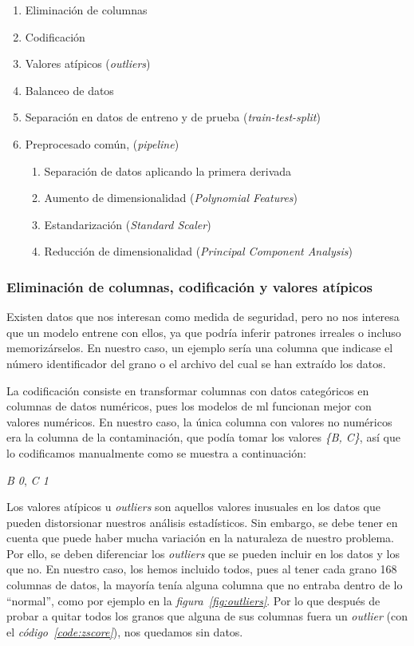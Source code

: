 \begin{enumerate}
    \item Eliminación de columnas
    \item Codificación
    \item Valores atípicos (\textit{outliers})
    \item Balanceo de datos
    \item Separación en datos de entreno y de prueba (\textit{train-test-split})
    \item Preprocesado común, (\textit{pipeline})
    \begin{enumerate}
        \item Separación de datos aplicando la primera derivada 
        \item Aumento de dimensionalidad (\textit{Polynomial Features})
        \item Estandarización  (\textit{Standard Scaler})
        \item Reducción de dimensionalidad (\textit{Principal Component Analysis})
    \end{enumerate}
    
\end{enumerate}


\subsubsection{Eliminación de columnas, codificación y valores atípicos}

Existen datos que nos interesan como medida de seguridad, pero no nos interesa que un modelo entrene con ellos, ya que podría inferir patrones irreales o incluso memorizárselos. En nuestro caso, un ejemplo sería una columna que indicase el número identificador del grano o el archivo del cual se han extraído los datos.

La codificación consiste en transformar columnas con datos categóricos en columnas de datos numéricos, pues los modelos de \acrshort{ml} funcionan mejor con valores numéricos. En nuestro caso, la única columna con valores no numéricos era la columna de la contaminación, que podía tomar los valores \textit{\{B, C\}}, así que lo codificamos manualmente como se muestra a continuación:

{\centering
    \textit{B \longrightarrow{} 0}, \textit{C \longrightarrow{} 1}\par
}

Los valores atípicos u \textit{outliers} son aquellos valores inusuales en los datos que pueden distorsionar nuestros análisis estadísticos. Sin embargo, se debe tener en cuenta que puede haber mucha variación en la naturaleza de nuestro problema. Por ello, se deben diferenciar los \textit{outliers} que se pueden incluir en los datos y los que no. En nuestro caso, los hemos incluido todos, pues al tener cada grano 168 columnas de datos, la mayoría tenía alguna columna que no entraba dentro de lo ``normal'', como por ejemplo en la \textit{figura\ \ref{fig:outliers}}. Por lo que después de probar a quitar todos los granos que alguna de sus columnas fuera un \textit{outlier} (con el \textit{código\ \ref{code:zscore}}), nos quedamos sin datos.

